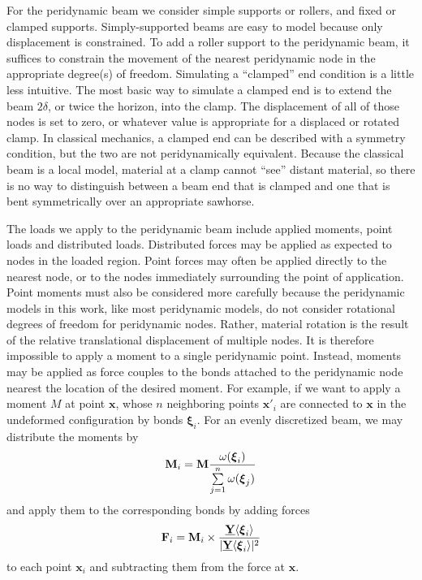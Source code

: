 For the peridynamic beam we consider simple supports or rollers, and fixed or clamped supports.
Simply-supported beams are easy to model because only displacement is constrained.
To add a roller support to the peridynamic beam, it suffices to constrain the movement of the nearest peridynamic node in the appropriate degree(s) of freedom.
Simulating a ``clamped'' end condition is a little less intuitive. 
The most basic way to simulate a clamped end is to extend the beam \(2\delta\), or twice the horizon, into the clamp. The displacement of all of those nodes is set to zero, or whatever value is appropriate for a displaced or rotated clamp.
In classical mechanics, a clamped end can be described with a symmetry condition, but the two are not peridynamically equivalent.
Because the classical beam is a local model, material at a clamp cannot ``see'' distant material, so there is no way to distinguish between a beam end that is clamped and one that is bent symmetrically over an appropriate sawhorse.

The loads we apply to the peridynamic beam include applied moments, point loads and distributed loads.
Distributed forces may be applied as expected to nodes in the loaded region.
Point forces may often be applied directly to the nearest node, or to the nodes immediately surrounding the point of application.
Point moments must also be considered more carefully because the peridynamic models in this work, like most peridynamic models, do not consider rotational degrees of freedom for peridynamic nodes.
Rather, material rotation is the result of the relative translational displacement of multiple nodes.
It is therefore impossible to apply a moment to a single peridynamic point.
Instead, moments may be applied as force couples to the bonds attached to the peridynamic node nearest the location of the desired moment.
For example, if we want to apply a moment $M$ at point $\mathbf{x}$, whose $n$ neighboring points $\mathbf{x}'_i$ are connected to $\mathbf{x}$ in the undeformed configuration by bonds $\boldsymbol{\xi}_i$.
For an evenly discretized beam, we may distribute the moments by
\begin{equation}
\mathbf{M}_i = \mathbf{M} \frac{\omega(\boldsymbol{\xi}_i)}{\sum\limits_{j=1}^n \omega(\boldsymbol{\xi}_j)}\notag
\end{equation}
and apply them to the corresponding bonds by adding forces
\begin{equation}
\mathbf{F}_i = \mathbf{M}_i \times \frac{\vstate{Y}{}{\boldsymbol{\xi}_i}}{|\vstate{Y}{}{\boldsymbol{\xi}_i}|^2}\notag
\end{equation}
to each point $\mathbf{x}_i$ and subtracting them from the force at $\mathbf{x}$.

